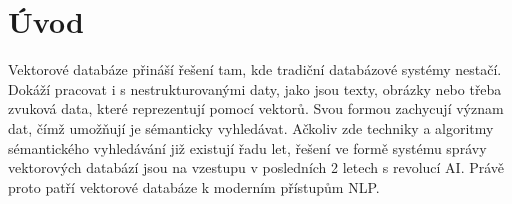 %

\chapter{Úvod}

Vektorové databáze přináší řešení tam, kde tradiční databázové systémy nestačí. Dokáží pracovat i s nestrukturovanými daty, jako jsou texty, obrázky nebo třeba zvuková data, které reprezentují pomocí vektorů. Svou formou zachycují význam dat, čímž umožňují je sémanticky vyhledávat. Ačkoliv zde techniky a algoritmy sémantického vyhledávání již existují řadu let, řešení ve formě systému správy vektorových databází jsou na vzestupu v posledních 2 letech s revolucí AI. Právě proto patří vektorové databáze k moderním přístupům NLP.

